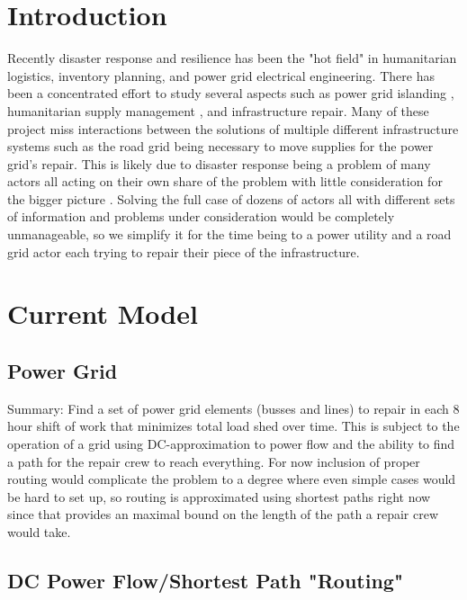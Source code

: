 \documentclass{article}
\begin{document}
	\section{Introduction}
	Recently disaster response and resilience has been the "hot field" in humanitarian logistics, inventory planning, and power grid electrical engineering. There has been a concentrated effort to study several aspects such as power grid islanding \cite{PanteliEA2016} \cite{DeepjyotiEA2018}, humanitarian supply management \cite{JiangEA2012} \cite{CaunhyeEA2012}, and infrastructure repair\cite{AksuEA2014}. Many of these project miss interactions between the solutions of multiple different infrastructure systems such as the road grid being necessary to move supplies for the power grid's repair. This is likely due to disaster response being a problem of many actors all acting on their own share of the problem with little consideration for the bigger picture\cite{VerasEA2012} . Solving the full case of dozens of actors all with different sets of information and problems under consideration would be completely unmanageable, so we simplify it for the time being to a power utility and a road grid actor each trying to repair their piece of the infrastructure.
	
	\section{Current Model}
	\subsection{Power Grid}
	Summary: Find a set of power grid elements (busses and lines) to repair in each 8 hour shift of work that minimizes total load shed over time. This is subject to the operation of a grid using DC-approximation to power flow and the ability to find a path for the repair crew to reach everything. For now inclusion of proper routing would complicate the problem to a degree where even simple cases would be hard to set up, so routing is approximated using shortest paths right now since that provides an maximal bound on the length of the path a repair crew would take. 
	
	\subsection{DC Power Flow/Shortest Path "Routing"}	
\end{document}
